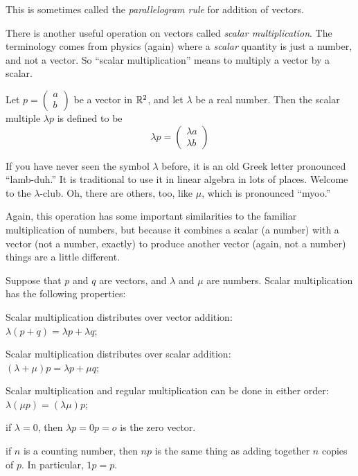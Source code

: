 \documentclass[00-livre-main.tex]{subfiles}
\begin{document}
This is sometimes called the \emph{parallelogram rule} for addition of vectors.

There is another useful operation on vectors called \emph{scalar multiplication}.
The terminology comes from physics (again) where a \emph{scalar} quantity is just a number, and not a vector.
So ``scalar multiplication'' means to multiply a vector by a scalar.


\begin{definition}
Let $p = \left( \begin{smallmatrix} a \\ b \end{smallmatrix}\right)$ be a vector in $\mathbb{R}^2$, and let $\lambda$ be a real number. Then the scalar multiple $\lambda p$ is defined to be
\[
\lambda p = \begin{pmatrix} \lambda a \\ \lambda b \end{pmatrix}
\]
\end{definition}

If you have never seen the symbol $\lambda$ before, it is an old Greek letter pronounced ``lamb-duh.'' It is traditional to use it in linear algebra in lots of places. Welcome to the $\lambda$-club. Oh, there are others, too, like $\mu$, which is pronounced ``myoo.''

Again, this operation has some important similarities to the familiar multiplication of numbers, but because it combines a scalar (a number) with a vector (not a number, exactly) to produce another vector (again, not a number) things are a little different.

\begin{theorem}
Suppose that $p$ and $q$ are vectors, and $\lambda$ and $\mu$ are numbers. Scalar multiplication has the following properties:
\begin{compactitem}
\item Scalar multiplication distributes over vector addition:\\ $\lambda(p+q) = \lambda p + \lambda q$;
\item Scalar multiplication distributes over scalar addition:\\ $(\lambda + \mu)p = \lambda p + \mu q$;
\item Scalar multiplication and regular multiplication can be done in either order: $\lambda(\mu p) = (\lambda\mu) p$;
\item if $\lambda = 0$, then $\lambda p = 0 p = o$ is the zero vector.
\item if $n$ is a counting number, then $np$ is the same thing as adding together $n$ copies of $p$. In particular, $1p = p$.
\end{compactitem}
\end{theorem}
\end{document}
